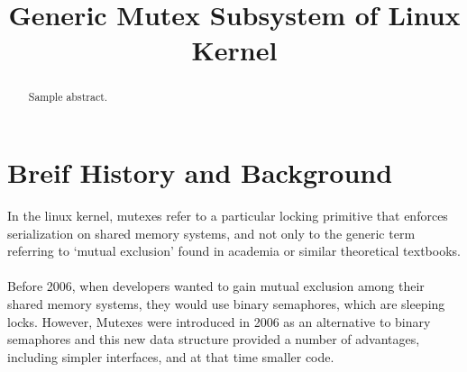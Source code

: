 \documentclass[10pt,preprint]{sigplanconf}
\date{}
\begin{document}
\title{Generic Mutex Subsystem of Linux Kernel} 
\maketitle

\begin{abstract}

Sample abstract.

\end{abstract}

\section{Breif History and Background}

In the linux kernel, mutexes refer to a particular locking primitive that enforces serialization on shared memory systems, and not only to the generic term referring to ‘mutual exclusion’ found in academia or similar theoretical textbooks. \\\\
Before 2006, when developers wanted to gain mutual exclusion among their shared memory systems, they would use binary semaphores, which are sleeping locks. However, Mutexes were introduced in 2006 as an alternative to binary semaphores and this new data structure provided a number of advantages, including simpler interfaces, and at that time smaller code. 
\end{document}
